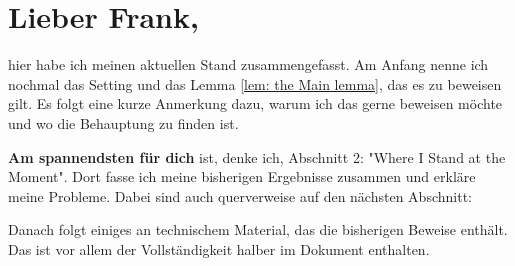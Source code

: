 \pagestyle{empty}
\section{Lieber Frank,}

hier habe ich meinen aktuellen Stand zusammengefasst. Am Anfang nenne ich nochmal das Setting und das Lemma \ref{lem: the Main lemma}, das es zu beweisen gilt. Es folgt eine kurze Anmerkung dazu, warum ich das gerne beweisen möchte und wo die Behauptung zu finden ist.

\textbf{Am spannendsten für dich} ist, denke ich, Abschnitt 2: "Where I Stand at the Moment". Dort fasse ich meine bisherigen Ergebnisse zusammen und erkläre meine Probleme. Dabei sind auch querverweise auf den nächsten Abschnitt:

Danach folgt einiges an technischem Material, das die bisherigen Beweise enthält. Das ist vor allem der Vollständigkeit halber im Dokument enthalten.
